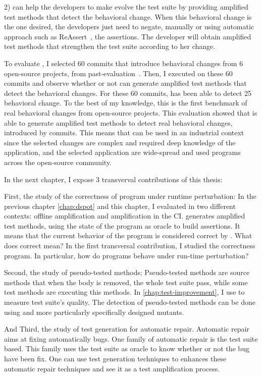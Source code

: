 2) \DCI can help the developers to make evolve the test suite by providing amplified test methods that detect the behavioral change.
When this behavioral change is the one desired, the developers just need to negate, manually or using automatic approach such as ReAssert~\cite{ReAssert}, the assertions.
The developer will obtain amplified test methods that strengthen the test suite according to her change.

To evaluate \DCI, I selected 60 commits that introduce behavioral changes from 6 open-source projects, from past-evaluation~\cite{descartes,Danglot2018}.
Then, I executed \DCI on these 60 commits and observe whether or not \DCI can generate amplified test methods that detect the behavioral changes.
For these 60 commits, \DCI has been able to detect 25 behavioral change.
To the best of my knowledge, this is the first benchmark of real behavioral changes  from open-source projects.
This evaluation showed that \DCI is able to generate amplified test methods to detect real behavioral changes, introduced by commits.
This means that \DCI can be used in an industrial context since the selected changes are complex and required deep knowledge of the application, and the selected application are wide-spread and used programs across the open-source community.

In the next chapter, I expose 3 transverval contributions of this thesis:

First, the study of the correctness of program under runtime perturbation:
In the previous chapter \autoref{chap:dspot} and this chapter, I evaluated \dspot in two different contexts: offline amplification and amplification in the CI.
\dspot generates amplified test methods, using the state of the program as oracle to build assertions.
It means that the current behavior of the program is considered correct by \dspot.
What does correct mean? In the first transversal contribution, I studied the correctness program.
In particular, how do programs behave under run-time perturbation?

Second, the study of pseudo-tested methods;
Pseudo-tested methods are source methods that when the body is removed, the whole test suite pass, while some test methods are executing this methods.
In \autoref{chap:test-improvement}, I use \ms to measure test suite's quality.
The detection of pseudo-tested methods can be done using \ms and more particularly specifically designed mutants.

And Third, the study of test generation for automatic repair.
Automatic repair aims at fixing automatically bugs.
One family of automatic repair is the test suite based.
This family uses the test suite as oracle to know whether or not the bug have been fix.
One can use test generation techniques to enhances these automatic repair techniques and see it as a test amplification process.